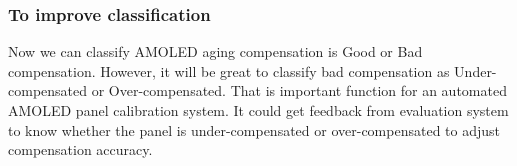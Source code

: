 \documentclass[runningheads]{llncs}
\begin{document}
\subsubsection{To improve classification}
Now we can classify AMOLED aging compensation is Good or Bad compensation. However, it will be great to classify bad compensation as Under-compensated or Over-compensated. That is important function for an automated AMOLED panel calibration system. It could get feedback from evaluation system to know whether the panel is under-compensated or over-compensated to adjust compensation accuracy.
%
%
%
% 
% 
%


\end{document}
